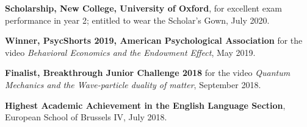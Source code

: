 \documentclass[11pt, a4paper]{article}
\begin{document}
\begin{flushleft}
    \hspace{1cm}\hangindent=1cm \textbf{Scholarship, New College, University of Oxford}, for excellent exam performance in year 2; entitled to wear the Scholar's Gown, July 2020. \\
\end{flushleft}
\begin{flushleft}
    \hspace{1cm}\hangindent=1cm \textbf{Winner, PsycShorts 2019, American Psychological Association} for the video \textit{Behavioral Economics and the Endowment Effect}, May 2019. \\
\end{flushleft}
\begin{flushleft}
    \hspace{1cm}\hangindent=1cm \textbf{Finalist, Breakthrough Junior Challenge 2018} for the video \textit{Quantum Mechanics and the Wave-particle duality of matter}, September 2018. \\
\end{flushleft}
\begin{flushleft} 
    \hspace{1cm}\hangindent=1cm \textbf{Highest Academic Achievement in the English Language Section}, European School of Brussels IV, July 2018. \\
\end{flushleft}
\end{document}
